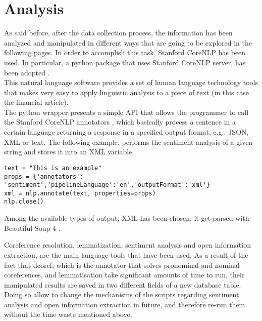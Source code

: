 \section{Analysis}
As said before, after the data collection process, the information has been analyzed and manipulated in different ways that are going to be explored in the following pages. In order to accomplish this task,
Stanford CoreNLP \cite{stanfordcorenlp} has been used. In particular, a python package that uses Stanford CoreNLP server, has been adopted \cite{corenlpwrapper}. \\
This natural language software provides a set of human language technology tools that makes very easy to apply linguistic analysis to a piece of text (in this case the financial article). \\
The python wrapper presents a simple API that allows the programmer to call the Stanford CoreNLP annotators \cite{annotators}, which basically process a sentence in a certain language returning a response in a specified output format, e.g.: JSON, XML or text. The following example, performs the sentiment analysis of a given string and stores it into an XML variable.
\begin{verbatim}
text = "This is an example"
props = {'annotators': 'sentiment','pipelineLanguage':'en','outputFormat':'xml'}
xml = nlp.annotate(text, properties=props)
nlp.close()
\end{verbatim}
Among the available types of output, XML has been chosen: it get parsed with Beautiful Soup 4 \cite{bs4}. \par 
Coreference resolution, lemmatization, sentiment analysis and open information extraction, are the main language tools that have been used. As a result of the fact that dcoref, which is the annotator that solves pronominal and nominal coreferences, and lemmatisation take significant amounts of time to run, their manipulated results are saved in two different fields of a new database table. Doing so allow to change the mechanisms of the scripts regarding sentiment analysis and open information extraction in future, and therefore re-run them without the time waste mentioned above.




